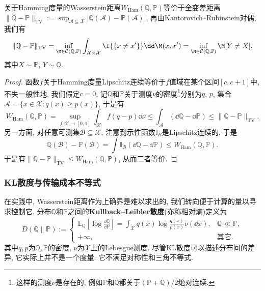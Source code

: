 \begin{example}[Hamming度量和全变差距离]\label{ex:HammingMetricAndTVDistance}
	关于Hamming度量的Wasserstein距离$W_{\text{Ham}}(\mathbb{Q}, \mathbb{P})$等价于全变差距离$\|\mathbb{Q} - \mathbb{P}\|_{\text{TV}} := \sup_{\mathcal{A} \subseteq \mathcal{X}} |\mathbb{Q}(\mathcal{A}) - \mathbb{P}(\mathcal{A})|$, 再由Kantorovich–Rubinstein对偶, 我们有
	\begin{equation*}
		\|\mathbb{Q} - \mathbb{P}\|_{\text{TV}}
		= \inf_{\M \in \mathcal{C}(\mathbb{Q}, \mathbb{P})} \int_{\mathcal{X} \times \mathcal{X}} \I{\{x \neq x'\}} \dd \M(x, x')
		= \inf_{\M \in \mathcal{C}(\mathbb{Q}, \mathbb{P})} \M[Y \neq X], 
	\end{equation*}
	其中$X \sim \mathbb{P}$, $Y \sim \mathbb{Q}$. 
	\begin{proof}
	函数$f$关于Hamming度量Lipschitz连续等价于$f$值域在某个区间$[c, c+1]$中, 不失一般性地, 我们假定$c = 0$. 
	记$\mathbb{Q}$和$\mathbb{P}$关于测度$\nu$的密度\footnote{这样的测度$\nu$是存在的, 例如$\mathbb{P}$和$\mathbb{Q}$都关于$(\mathbb{P} + \mathbb{Q})/2$绝对连续.}分别为$q$, $p$, 集合$\mathcal{A} = \{x \in \mathcal{X} \colon q(x) \geq p(x)\} $, 于是有
	\begin{equation*}
		W_{\text{Ham}}(\mathbb{Q}, \mathbb{P})
		= \sup_{f \colon \mathcal{X} \to [0, 1]} \int_{\mathcal{X}} f (q - p) \dd \nu 
		\leq \int_{\mathcal{A}} (\dd \mathbb{Q} - \dd \mathbb{P})
		\leq \|\mathbb{Q} - \mathbb{P}\|_{\text{TV}}. 
	\end{equation*}
	另一方面, 对任意可测集$\mathcal{B} \subseteq \mathcal{X}$, 注意到示性函数$\mathbb{I}_B$是Lipschitz连续的, 于是
	\begin{equation*}
		\mathbb{Q}(\mathcal{B}) - \mathbb{P}(\mathcal{B}) 
		= \int \mathbb{I}_{\mathcal{B}} (\dd \mathbb{Q} - \dd \mathbb{P}) 
		\leq W_{\text{Ham}}(\mathbb{Q}, \mathbb{P}). 
	\end{equation*}
	于是有$\|\mathbb{Q} - \mathbb{P}\|_{\text{TV}} \leq W_{\text{Ham}}(\mathbb{Q}, \mathbb{P})$, 从而二者等价. 
	\end{proof}
\end{example}

\subsubsection{KL散度与传输成本不等式}

在实践中, Wasserstein距离作为上确界是难以求出的, 我们转向便于计算的量以寻求控制它. 
分布$\mathbb{Q}$和$\mathbb{P}$之间的\textbf{Kullback–Leibler散度}(亦称相对熵)定义为
\begin{equation}
	D(\mathbb{Q} \| \mathbb{P})
	:= \begin{cases}
		\mathbb{E}_{\mathbb{Q}} \left[ \log \frac{\dd \mathbb{Q}}{\dd \mathbb{P}} \right]
		= \int_{\mathcal{X}} q(x) \log \frac{q(x)}{p(x)} \nu(\dd x), & \mathbb{Q} \ll \mathbb{P}, \\
		+\infty, &\text{其它}. 
	\end{cases} 
\end{equation}
其中$q, p$为$\mathbb{Q}, \mathbb{P}$的密度, $\nu$为$\mathcal{X}$上的Lebesgue测度. 
尽管KL散度可以描述分布间的差异, 它实际上并不是一个度量: 它不满足对称性和三角不等式. 

